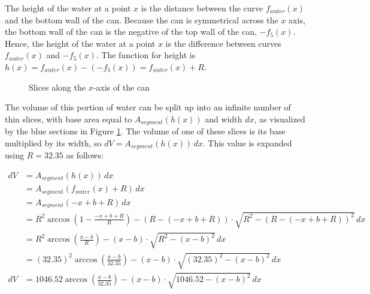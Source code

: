 \documentclass[11pt]{article}
\begin{document}
    The height of the water at a point $x$ is the distance between the curve $f_{water}(x)$ and the bottom wall of the can. Because the can is symmetrical across the $x$ axis, the bottom wall of the can is the negative of the top wall of the can, $-f_5(x)$. Hence, the height of the water at a point $x$ is the difference between curves $f_{water}(x)$ and $-f_5(x)$. The function for height is ${h(x) = f_{water}(x) - (-f_5(x)) = f_{water}(x) + R}$.

    \begin{figure}
        \centering
        \vspace{-10pt}
        \caption{Slices along the $x$-axis of the can}
        \label{fig:water-segments}
    \end{figure}

    The volume of this portion of water can be split up into an infinite number of thin slices, with base area equal to $A_{segment}(h(x))$ and width $dx$, as visualized by the blue sections in Figure \ref{fig:water-segments}. The volume of one of these slices is its base multiplied by its width, so $dV = A_{segment}(h(x)) \, dx$. This value is expanded using $R = 32.35$ as follows:

    {\footnotesize\begin{align*}
        dV &= A_{segment}(h(x)) \, dx \\
        &= A_{segment}(f_{water}(x) + R) \, dx \\
        &= A_{segment}(-x + b + R) \, dx \\
        &= R^2 \arccos{\left( 1 - \frac{-x + b + R}{R} \right)} - (R - (-x + b + R)) \cdot \sqrt{R^2 - (R - (-x + b + R))^2} \, dx \\
        &= R^2 \arccos{\left( \frac{x - b}{R} \right)} - (x - b) \cdot \sqrt{R^2 - (x - b)^2} \, dx \\
        &= (32.35)^2 \arccos{\left( \frac{x - b}{32.35} \right)} - (x - b) \cdot \sqrt{(32.35)^2 - (x - b)^2} \, dx \\
        dV &= 1046.52 \arccos{\left( \frac{x - b}{32.35} \right)} - (x - b) \cdot \sqrt{1046.52 - (x - b)^2} \, dx
    \end{align*}}
\end{document}
